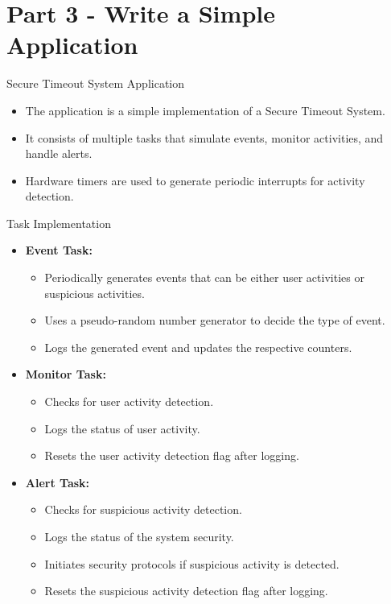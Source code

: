 
\section{Part 3 - Write a Simple Application}

\begin{frame}{Secure Timeout System Application}
    \begin{itemize}
        \item The application is a simple implementation of a Secure Timeout System.
        \item It consists of multiple tasks that simulate events, monitor activities, and handle alerts.
        \item Hardware timers are used to generate periodic interrupts for activity detection.
    \end{itemize}
\end{frame}

\begin{frame}{Task Implementation}
    \begin{itemize}
        \item \textbf{Event Task:}
        \begin{itemize}
            \item Periodically generates events that can be either user activities or suspicious activities.
            \item Uses a pseudo-random number generator to decide the type of event.
            \item Logs the generated event and updates the respective counters.
        \end{itemize}
        \item \textbf{Monitor Task:}
        \begin{itemize}
            \item Checks for user activity detection.
            \item Logs the status of user activity.
            \item Resets the user activity detection flag after logging.
        \end{itemize}
        \item \textbf{Alert Task:}
        \begin{itemize}
            \item Checks for suspicious activity detection.
            \item Logs the status of the system security.
            \item Initiates security protocols if suspicious activity is detected.
            \item Resets the suspicious activity detection flag after logging.
        \end{itemize}
    \end{itemize}
\end{frame}

